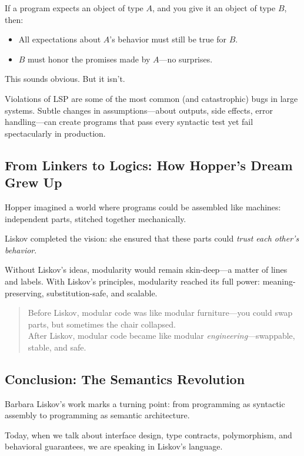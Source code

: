 If a program expects an object of type \( A \), and you give it an object of type \( B \), then:

\begin{itemize}
  \item All expectations about \( A \)'s behavior must still be true for \( B \).
  \item \( B \) must honor the promises made by \( A \)—no surprises.
\end{itemize}

This sounds obvious. But it isn’t.

Violations of LSP are some of the most common (and catastrophic) bugs in large systems. Subtle changes in assumptions—about outputs, side effects, error handling—can create programs that pass every syntactic test yet fail spectacularly in production.

\subsection{From Linkers to Logics: How Hopper’s Dream Grew Up}

Hopper imagined a world where programs could be assembled like machines: independent parts, stitched together mechanically.

Liskov completed the vision: she ensured that these parts could \textit{trust each other’s behavior}.

Without Liskov’s ideas, modularity would remain skin-deep—a matter of lines and labels.  
With Liskov’s principles, modularity reached its full power: meaning-preserving, substitution-safe, and scalable.

\begin{quote}
Before Liskov, modular code was like modular furniture—you could swap parts, but sometimes the chair collapsed.\\
After Liskov, modular code became like modular \emph{engineering}—swappable, stable, and safe.
\end{quote}

\subsection{Conclusion: The Semantics Revolution}

Barbara Liskov’s work marks a turning point: from programming as syntactic assembly to programming as semantic architecture.

Today, when we talk about interface design, type contracts, polymorphism, and behavioral guarantees, we are speaking in Liskov’s language.

